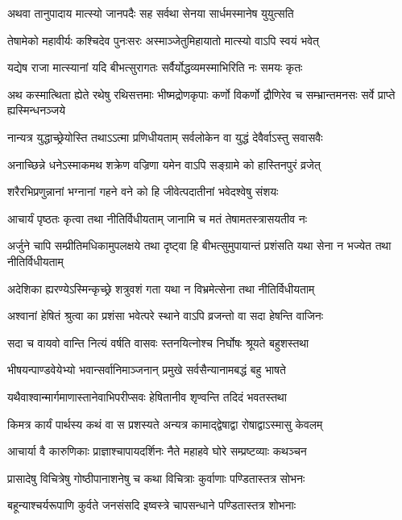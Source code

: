 \twolineshloka
{अथवा तानुपादाय मात्स्यो जानपदैः सह}
{सर्वथा सेनया सार्धमस्मानेष युयुत्सति}


\twolineshloka
{तेषामेको महावीर्यः कश्चिदेव पुनःसरः}
{अस्माञ्जेतुमिहायातो मात्स्यो वाऽपि स्वयं भवेत्}


\twolineshloka
{यद्येष राजा मात्स्यानां यदि बीभत्सुरागतः}
{सर्वैर्योद्धव्यमस्माभिरिति नः समयः कृतः}


\threelineshloka
{अथ कस्मात्थिता ह्येते रथेषु रथिसत्तमाः}
{भीष्मद्रोणकृपाः कर्णो विकर्णो द्रौणिरेव च}
{सम्भ्रान्तमनसः सर्वे प्राप्ते ह्यस्मिन्धनञ्जये}


\twolineshloka
{नान्यत्र युद्धाच्छ्रेयोस्ति तथाऽऽत्मा प्रणिधीयताम्}
{सर्वलोकेन वा युद्धं देवैर्वाऽस्तु सवासवैः}


\twolineshloka
{अनाच्छिन्ने धनेऽस्माकमथ शक्रेण वज्रिणा}
{यमेन वाऽपि सङ्ग्रामे को हास्तिनपुरं व्रजेत्}


\twolineshloka
{शरैरभिप्रणुन्नानां भग्नानां गहने वने}
{को हि जीवेत्पदातीनां भवेदश्वेषु संशयः}


\twolineshloka
{आचार्यं पृष्ठतः कृत्वा तथा नीतिर्विधीयताम्}
{जानामि च मतं तेषामतस्त्रासयतीव नः}


\threelineshloka
{अर्जुने चापि सम्प्रीतिमधिकामुपलक्षये}
{तथा दृष्ट्वा हि बीभत्सुमुपायान्तं प्रशंसति}
{यथा सेना न भज्येत तथा नीतिर्विधीयताम्}


\twolineshloka
{अदेशिका ह्यरण्येऽस्मिन्कृच्छ्रे शत्रुवशं गता}
{यथा न विभ्रमेत्सेना तथा नीतिर्विधीयताम्}


\twolineshloka
{अश्वानां हेषितं श्रुत्वा का प्रशंसा भवेत्परे}
{स्थाने वाऽपि व्रजन्तो वा सदा हेषन्ति वाजिनः}


\twolineshloka
{सदा च वायवो वान्ति नित्यं वर्षति वासवः}
{स्तनयित्नोश्च निर्घोषः श्रूयते बहुशस्तथा}


\twolineshloka
{भीषयन्पाण्डवेयेभ्यो भवान्सर्वानिमाञ्जनान्}
{प्रमुखे सर्वसैन्यानामबद्धं बहु भाषते}


\twolineshloka
{यथैवाश्वान्मार्गमाणास्तानेवाभिपरीप्सवः}
{हेषितानीव शृण्वन्ति तदिदं भवतस्तथा}


\twolineshloka
{किमत्र कार्यं पार्थस्य कथं वा स प्रशस्यते}
{अन्यत्र कामाद्द्वेषाद्वा रोषाद्वाऽस्मासु केवलम्}


\twolineshloka
{आचार्या वै कारुणिकाः प्राज्ञाश्चापायदर्शिनः}
{नैते महाहवे घोरे सम्प्रष्टव्याः कथञ्चन}


\twolineshloka
{प्रासादेषु विचित्रेषु गोष्ठीपानाशनेषु च}
{कथा विचित्राः कुर्वाणाः पण्डितास्तत्र सोभनः}


\twolineshloka
{बहून्याश्चर्यरूपाणि कुर्वते जनसंसदि}
{इष्वस्त्रे चापसन्धाने पण्डितास्तत्र शोभनाः}


